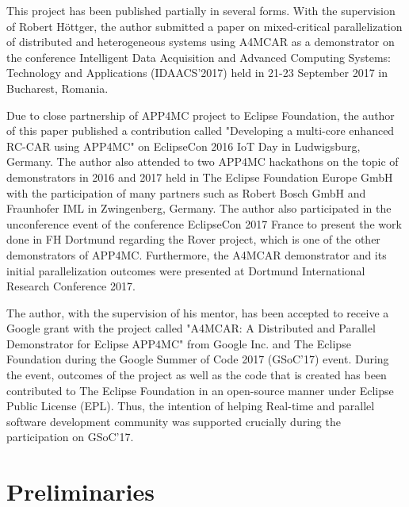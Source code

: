 This project has been published partially in several forms. With the supervision of Robert H{\"o}ttger, the author submitted a paper on mixed-critical parallelization of distributed and heterogeneous systems \cite{constrainedpaper} using A4MCAR as a demonstrator on the conference Intelligent Data Acquisition and Advanced Computing Systems: Technology and Applications (IDAACS'2017) held in 21-23 September 2017 in Bucharest, Romania.

Due to close partnership of APP4MC project to Eclipse Foundation, the author of this paper published a contribution called "Developing a multi-core enhanced RC-CAR using APP4MC" on EclipseCon 2016 IoT Day in Ludwigsburg, Germany. The author also attended to two APP4MC hackathons on the topic of demonstrators in 2016 and 2017 held in The Eclipse Foundation Europe GmbH with the participation of many partners such as Robert Bosch GmbH and Fraunhofer IML in Zwingenberg, Germany. The author also participated in the unconference event of the conference EclipseCon 2017 France to present the work done in FH Dortmund regarding the Rover project, which is one of the other demonstrators of APP4MC. Furthermore, the A4MCAR demonstrator and its initial parallelization outcomes were presented at Dortmund International Research Conference 2017.

The author, with the supervision of his mentor, has been accepted to receive a Google grant with the project called "A4MCAR: A Distributed and Parallel Demonstrator for Eclipse APP4MC" \cite{gsoc} from Google Inc. and The Eclipse Foundation during the Google Summer of Code 2017 (GSoC'17) event. During the event, outcomes of the project as well as the code that is created has been contributed to The Eclipse Foundation in an open-source manner under Eclipse Public License (EPL). Thus, the intention of helping Real-time and parallel software development community was supported crucially during the participation on GSoC'17.
\newpage
\section{Preliminaries}
